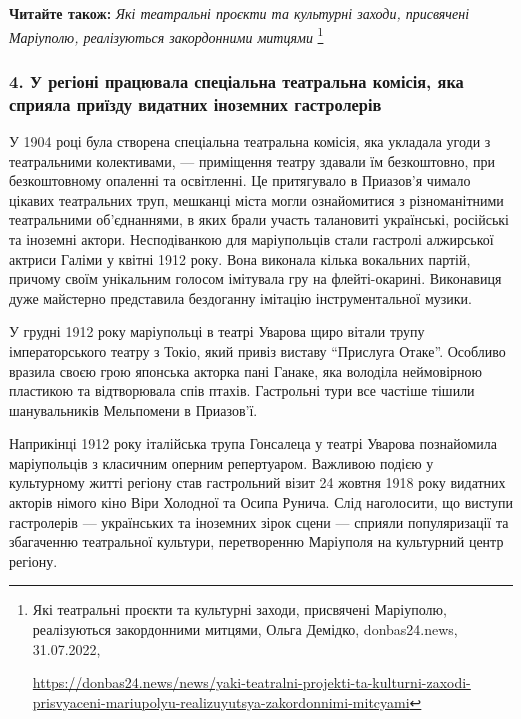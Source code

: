 
\textbf{Читайте також:} \emph{Які театральні проєкти та культурні заходи, присвячені Маріуполю, реалізуються закордонними митцями}%
\footnote{Які театральні проєкти та культурні заходи, присвячені Маріуполю, реалізуються закордонними митцями, %
Ольга Демідко, donbas24.news, 31.07.2022, \par%
\url{https://donbas24.news/news/yaki-teatralni-projekti-ta-kulturni-zaxodi-prisvyaceni-mariupolyu-realizuyutsya-zakordonnimi-mitcyami}%
}

\subsubsection{4. У регіоні працювала спеціальна театральна комісія, яка сприяла приїзду видатних іноземних гастролерів}

У 1904 році була створена спеціальна театральна комісія, яка укладала угоди з
театральними колективами, — приміщення театру здавали їм безкоштовно, при
безкоштовному опаленні та освітленні. Це притягувало в Приазов'я чимало цікавих
театральних труп, мешканці міста могли ознайомитися з різноманітними
театральними об'єднаннями, в яких брали участь талановиті українські, російські
та іноземні актори. Несподіванкою для маріупольців стали гастролі алжирської
актриси Галіми у квітні 1912 року. Вона виконала кілька вокальних партій,
причому своїм унікальним голосом імітувала гру на флейті-окарині. Виконавиця
дуже майстерно представила бездоганну імітацію інструментальної музики.

У грудні 1912 року маріупольці в театрі Уварова щиро вітали трупу
імператорського театру з Токіо, який привіз виставу \enquote{Прислуга Отаке}. Особливо
вразила своєю грою японська акторка пані Ганаке, яка володіла неймовірною
пластикою та відтворювала спів птахів. Гастрольні тури все частіше тішили
шанувальників Мельпомени в Приазов'ї.

Наприкінці 1912 року італійська трупа Гонсалеца у театрі Уварова познайомила
маріупольців з класичним оперним репертуаром. Важливою подією у культурному
житті регіону став гастрольний візит 24 жовтня 1918 року видатних акторів
німого кіно Віри Холодної та Осипа Рунича. Слід наголосити, що виступи
гастролерів — українських та іноземних зірок сцени — сприяли популяризації та
збагаченню театральної культури, перетворенню Маріуполя на культурний центр
регіону.

